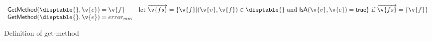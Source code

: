 \begin{figure*}
$$
\begin{array}{lclr}

  \getmethod {\disptable{}}
             {\v{e}}
             {\v{f}}

             & 
             \text{let } {\overrightarrow{\v{fs}}} = \{ \v{f} | (\v{v}, \v{f}) \in \disptable{} \text{ and } \isaopsem{\v{v}}{\v{e}} = \true{} \} \text{ if } {\overrightarrow{\v{fs}}} = \{\v{f}\}

             \\
  \getmethod {\disptable{}}
             {\v{e}}
             {\mmerror{}}

\end{array}
$$
\caption{Definition of get-method}
\end{figure*}
